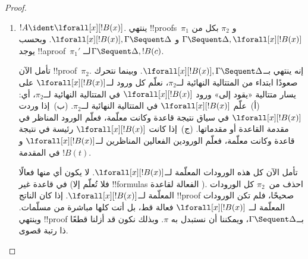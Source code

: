 \documentclass[../../../include/open-logic-section]{subfiles}
\begin{document}
\begin{proof}
\begin{enumerate}
  $\pi_2''$ نحصل أيضًا على !!a{proof}~$\pi_2'''$ لــ$!C, !B, \Gamma
  \Sequent \Delta$. ويكون !!{proof}~$\pi'$:
  \[
  \AxiomC{}
  \RightLabel{$\pi_2'$}
  \Deduce$\Gamma \fCenter \Delta, !B$
  \AxiomC{}
  \RightLabel{$\pi_1'$}
  \Deduce$!B, \Gamma \fCenter \Delta, !C$
  \AxiomC{}
  \RightLabel{$\pi_2'''$}
  \Deduce$!C, !B, \Gamma \fCenter \Delta$
  \RightLabel{\CutCS}
  \BinaryInf$!B, \Gamma \fCenter \Delta$
  \RightLabel{\CutCS}
  \BinaryInf$\Gamma \fCenter \Delta$
  \DisplayProof
  \]
  \item $!A \ident \lforall[x][!B(x)]$. ينتهي !!{proof}s~$\pi_1$ و
  $\pi_2$ بكل من $\Gamma \Sequent \Delta, \lforall[x][!B(x)]$ و
  $\lforall[x][!B(x)], \Gamma \Sequent \Delta$. وبحسب
   يوجد !!a{proof}~$\pi_1'$ لــ$\Gamma \Sequent
  \Delta, !B(c)$.

  تأمل الآن !!{proof}~$\pi_2$. إنه ينتهي بــ$\lforall[x][!B(x)],
  \Gamma \Sequent \Delta$. وبينما نتحرك صعودًا ابتداء من المتتالية النهائية
  لــ$\pi_2$، نعلّم كل ورود لــ$\lforall[x][!B(x)]$ على يسار متتالية «يقود
  إلى» ورود $\lforall[x][!B(x)]$ في المتتالية النهائية لــ$\pi_2$، أي:
  (أ)~علّم $\lforall[x][!B(x)]$ في المتتالية النهائية لــ$\pi_2$.
  (ب)~إذا وردت $\lforall[x][!B(x)]$ في سياق نتيجة قاعدة وكانت معلّمة،
  فعلّم الورود المناظر في مقدمة القاعدة أو مقدماتها. (ج)~إذا كانت
  $\lforall[x][!B(x)]$ رئيسة في نتيجة قاعدة \LeftR{\lforall} وكانت معلّمة،
  فعلّم الورودين الفعالين المناظرين لــ$\lforall[x][!B(x)]$ و$!B(t)$ في
  المقدمة.

  تأمل الآن كل هذه الورودات المعلّمة لــ$\lforall[x][!B(x)]$. لا يكون أي
  منها فعالًا في قاعدة غير \LeftR{\lforall} (فلا تُعلّم إلا !!{formula}s
  الفعالة لقاعدة \LeftR{\lforall}). احذف من~$\pi_2$ كل الورودات المعلّمة
  لــ$\lforall[x][!B(x)]$.
  إذا كان الناتج !!{proof} صحيحًا، فلم تكن الورودات المعلّمة لــ
  $\lforall[x][!B(x)]$ فعالة قط، بل أتت كلها مباشرة من مسلّمات. وينتهي
  !!{proof} بــ$\Gamma \Sequent \Delta$، ويمكننا أن نستبدل به $\pi$.
  وبذلك نكون قد أزلنا قطعًا ذا رتبة قصوى.


\end{enumerate}
\end{proof}
\end{document}

